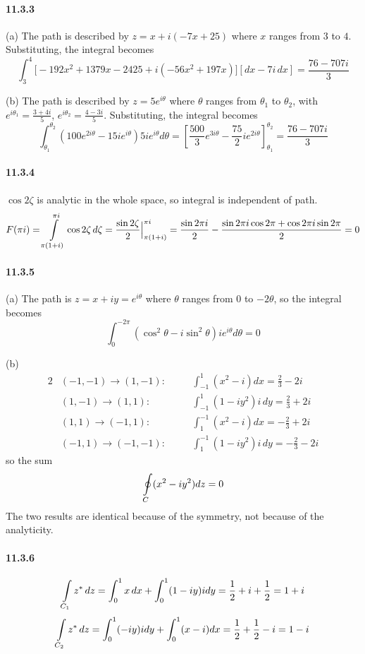 \documentclass[a4paper]{article}
\begin{document}
\paragraph{11.3.3}
(a) The path is described by $z=x+i(-7x+25)$ where $x$ ranges from $3$ to $4$. Substituting, the integral becomes
\[
\int_3^4\big[-192x^2+1379x-2425+i(-56x^2+197x) \big][dx-7i\,dx]=\frac{76-707i}{3}
\]

(b) The path is described by $z=5e^{i\theta}$ where $\theta$ ranges from $\theta_1$ to $\theta_2$, with $e^{i\theta_1}=\frac{3+4i}{5}$,\; $e^{i\theta_2}=\frac{4-3i}{5}$. Substituting, the integral becomes
\[
\int_{\theta_1}^{\theta_2}\left(100e^{2i\theta}-15ie^{i\theta} \right)5ie^{i\theta}d\theta
=\left[\frac{500}{3}e^{3i\theta}-\frac{75}{2}ie^{2i\theta} \right]_{\theta_1}^{\theta_2}
=\frac{76-707i}{3}
\]

\paragraph{11.3.4}
$\cos 2\zeta$ is analytic in the whole space, so integral is independent of path. 
\[
F(\pi i)=\int\displaylimits_{\pi(1+i)}^{\pi i}\cos2\zeta\,d\zeta=\frac{\sin2\zeta}{2}\Big|_{\pi(1+i)}^{\pi i}=\frac{\sin2\pi i}{2}-\frac{\sin2\pi i\cos 2\pi+\cos 2\pi i\sin 2\pi}{2}=0
\]

\paragraph{11.3.5}
(a) 
The path is $z=x+iy=e^{i\theta}$ where $\theta$ ranges from $0$ to $-2\theta$, so the integral becomes
\[
\int_0^{-2\pi}(\cos^2\theta-i\sin^2\theta)ie^{i\theta}d\theta=0
\]

(b) 
\begin{alignat*}{2}
    & (-1,-1)\rightarrow(1,-1):\quad && \int_{-1}^1(x^2-i)dx=\frac{2}{3}-2i\\
    & (1,-1)\rightarrow(1,1):\quad && \int_{-1}^1(1-iy^2)i\,dy=\frac{2}{3}+2i\\
    & (1,1)\rightarrow(-1,1):\quad && \int_{1}^{-1}(x^2-i)dx=-\frac{2}{3}+2i\\
    & (-1,1)\rightarrow(-1,-1):\quad && \int_{1}^{-1}(1-iy^2)i\,dy=-\frac{2}{3}-2i
\end{alignat*}
so the sum
\[
\oint\displaylimits_C(x^2-iy^2)dz=0
\]
The two results are identical because of the symmetry, not because of the analyticity.

\paragraph{11.3.6}
\[
\int\displaylimits_{C_1}z^*\,dz=\int_0^1x\,dx+\int_0^1(1-iy)idy=\frac{1}{2}+i+\frac{1}{2}=1+i
\]
\[
\int\displaylimits_{C_2}z^*\,dz=\int_0^1(-iy)idy+\int_0^1(x-i)dx=\frac{1}{2}+\frac{1}{2}-i=1-i
\]
\end{document}
